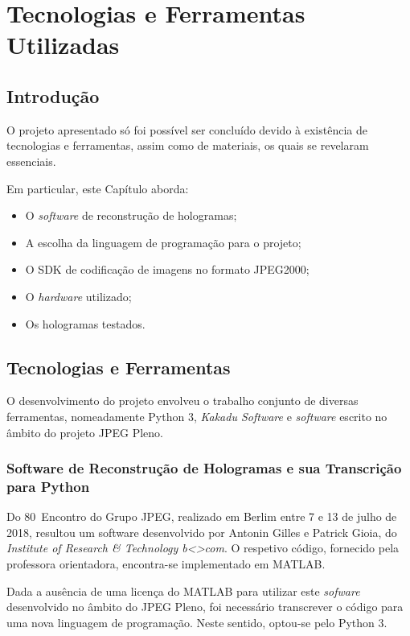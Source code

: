 \chapter{Tecnologias e Ferramentas Utilizadas}
\label{ch::tecno-ferr}

\section{Introdução}
\label{sec::tecno-ferr:intro}

O projeto apresentado só foi possível ser concluído devido à existência de tecnologias e ferramentas, assim como de materiais, os quais se revelaram essenciais.

Em particular, este Capítulo aborda:

\begin{itemize}
    \item O \textit{software} de reconstrução de hologramas;
    \item A escolha da linguagem de programação para o projeto;
    \item O \ac{SDK} de codificação de imagens no formato JPEG2000;
    \item O \textit{hardware} utilizado;
    \item Os hologramas testados.
\end{itemize}


\section{Tecnologias e Ferramentas}
\label{sec::tecno-ferr:tecno-ferr}

O desenvolvimento do projeto envolveu o trabalho conjunto de diversas ferramentas, nomeadamente Python 3, \textit{Kakadu Software} e \textit{software} escrito no âmbito do projeto JPEG Pleno.

\subsection{Software de Reconstrução de Hologramas e sua Transcrição para Python}

Do 80\textordmasculine~Encontro do Grupo JPEG, realizado em Berlim entre 7 e 13 de julho de 2018, resultou um software desenvolvido por Antonin Gilles e Patrick Gioia, do \textit{Institute of Research \& Technology b<>com}. O respetivo código, fornecido pela professora orientadora, encontra-se implementado em MATLAB.

Dada a ausência de uma licença do MATLAB para utilizar este \textit{sofware} desenvolvido no âmbito do JPEG Pleno, foi necessário transcrever o código para uma nova linguagem de programação. Neste sentido, optou-se pelo Python 3.


